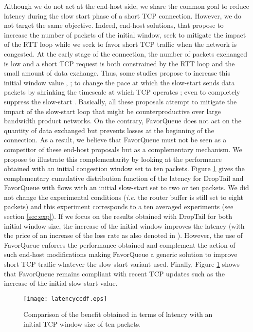 \documentclass{elsart}
\begin{document}
Although we do not act at the end-host side, we share the common goal to reduce latency during the slow start phase of a short TCP connection. However, we do not target the same objective. Indeed, end-host solutions,
that propose to increase the number of packets of the initial window, seek to mitigate the impact of the RTT loop while we seek to favor short TCP traffic when the network is congested. At the early stage of the connection, 
the number of packets exchanged is low and a short TCP request is both constrained by the RTT loop and the small amount of data exchange. Thus, some studies propose to increase this initial window value \cite{dukkipati10}, \cite{scharf09}; to change the pace at which the slow-start sends data packets by shrinking the timescale at which TCP operates \cite{kaur09rapid}; even to completely suppress the slow-start \cite{jumpstart}. Basically, all these proposals attempt 
to mitigate the impact of the slow-start loop that might be counterproductive over large bandwidth product networks. On the contrary, FavorQueue does not act on the quantity of data exchanged but prevents losses at the beginning 
of the connection.
As a result, we believe that FavorQueue must not be seen as a competitor of these end-host proposals but as a complementary mechanism. 
We propose to illustrate this complementarity by looking at the performance obtained with an initial congestion window set to ten packets. 
Figure \ref{fig:iw10latency} gives the complementary cumulative distribution function of the latency for DropTail and FavorQueue with flows with an initial slow-start set to two or ten packets. We did not change the experimental conditions (\textit{i.e.} the router buffer is still set to eight packets) and this experiment corresponds to a ten averaged experiments (see section \ref{sec:exp}). If we focus on the results obtained with DropTail for both initial window size, the increase of the initial window improves the latency (with the price of an increase of the loss rate as also denoted in \cite{dukkipati10}). However, the use of FavorQueue enforces the performance obtained and complement the action of such end-host modifications making FavorQueue a generic solution to improve short TCP traffic whatever the slow-start variant used.
Finally, Figure \ref{fig:iw10latency}  shows that FavorQueue remains compliant with recent TCP updates such as the increase of the initial slow-start value.

\begin{figure}[htb!]
   	\centering
	\texttt{[image: latencyccdf.eps]}
	\caption{Comparison of the benefit obtained in terms of latency with an initial TCP window size of ten packets.}
	\label{fig:iw10latency}
\end{figure}
\end{document}
